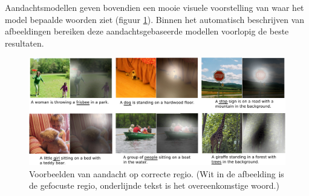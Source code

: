 Aandachtsmodellen geven bovendien een mooie visuele voorstelling van waar het model bepaalde woorden ziet (figuur \ref{fig:attention-example}). Binnen het automatisch beschrijven van afbeeldingen bereiken deze aandachtsgebaseerde modellen voorlopig de beste resultaten\cite{Jin2015,Xu2015}.

\begin{figure}[tb]
	\centering
	\includegraphics[width=\linewidth]{Images/good_Xu.pdf}
	\caption[Voorbeelden van aandacht op correcte regio.]{Voorbeelden van aandacht op correcte regio. (Wit in de afbeelding is de gefocuste regio, onderlijnde tekst is het overeenkomstige woord.)\cite{Xu2015}}
	\label{fig:attention-example}
\end{figure}

